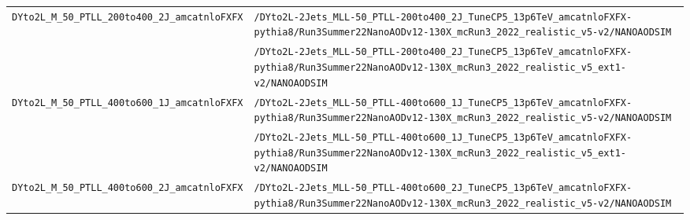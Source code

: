 \begin{longtable}{@{}>{\RaggedRight\arraybackslash}p{} >{\RaggedRight\arraybackslash}p{}@{}}
\addlinespace[2pt]
\texttt{DYto2L\_\allowbreak{}M\_\allowbreak{}50\_\allowbreak{}PTLL\_\allowbreak{}200to400\_\allowbreak{}2J\_\allowbreak{}amcatnloFXFX} & \texttt{/\allowbreak{}DYto2L-\allowbreak{}2Jets\_\allowbreak{}MLL-\allowbreak{}50\_\allowbreak{}PTLL-\allowbreak{}200to400\_\allowbreak{}2J\_\allowbreak{}TuneCP5\_\allowbreak{}13p6TeV\_\allowbreak{}amcatnloFXFX-\allowbreak{}pythia8/\allowbreak{}Run3Summer22NanoAODv12-\allowbreak{}130X\_\allowbreak{}mcRun3\_\allowbreak{}2022\_\allowbreak{}realistic\_\allowbreak{}v5-\allowbreak{}v2/\allowbreak{}NANOAODSIM} \\
 & \texttt{/\allowbreak{}DYto2L-\allowbreak{}2Jets\_\allowbreak{}MLL-\allowbreak{}50\_\allowbreak{}PTLL-\allowbreak{}200to400\_\allowbreak{}2J\_\allowbreak{}TuneCP5\_\allowbreak{}13p6TeV\_\allowbreak{}amcatnloFXFX-\allowbreak{}pythia8/\allowbreak{}Run3Summer22NanoAODv12-\allowbreak{}130X\_\allowbreak{}mcRun3\_\allowbreak{}2022\_\allowbreak{}realistic\_\allowbreak{}v5\_\allowbreak{}ext1-\allowbreak{}v2/\allowbreak{}NANOAODSIM} \\
\addlinespace[2pt]
\texttt{DYto2L\_\allowbreak{}M\_\allowbreak{}50\_\allowbreak{}PTLL\_\allowbreak{}400to600\_\allowbreak{}1J\_\allowbreak{}amcatnloFXFX} & \texttt{/\allowbreak{}DYto2L-\allowbreak{}2Jets\_\allowbreak{}MLL-\allowbreak{}50\_\allowbreak{}PTLL-\allowbreak{}400to600\_\allowbreak{}1J\_\allowbreak{}TuneCP5\_\allowbreak{}13p6TeV\_\allowbreak{}amcatnloFXFX-\allowbreak{}pythia8/\allowbreak{}Run3Summer22NanoAODv12-\allowbreak{}130X\_\allowbreak{}mcRun3\_\allowbreak{}2022\_\allowbreak{}realistic\_\allowbreak{}v5-\allowbreak{}v2/\allowbreak{}NANOAODSIM} \\
 & \texttt{/\allowbreak{}DYto2L-\allowbreak{}2Jets\_\allowbreak{}MLL-\allowbreak{}50\_\allowbreak{}PTLL-\allowbreak{}400to600\_\allowbreak{}1J\_\allowbreak{}TuneCP5\_\allowbreak{}13p6TeV\_\allowbreak{}amcatnloFXFX-\allowbreak{}pythia8/\allowbreak{}Run3Summer22NanoAODv12-\allowbreak{}130X\_\allowbreak{}mcRun3\_\allowbreak{}2022\_\allowbreak{}realistic\_\allowbreak{}v5\_\allowbreak{}ext1-\allowbreak{}v2/\allowbreak{}NANOAODSIM} \\
\addlinespace[2pt]
\texttt{DYto2L\_\allowbreak{}M\_\allowbreak{}50\_\allowbreak{}PTLL\_\allowbreak{}400to600\_\allowbreak{}2J\_\allowbreak{}amcatnloFXFX} & \texttt{/\allowbreak{}DYto2L-\allowbreak{}2Jets\_\allowbreak{}MLL-\allowbreak{}50\_\allowbreak{}PTLL-\allowbreak{}400to600\_\allowbreak{}2J\_\allowbreak{}TuneCP5\_\allowbreak{}13p6TeV\_\allowbreak{}amcatnloFXFX-\allowbreak{}pythia8/\allowbreak{}Run3Summer22NanoAODv12-\allowbreak{}130X\_\allowbreak{}mcRun3\_\allowbreak{}2022\_\allowbreak{}realistic\_\allowbreak{}v5-\allowbreak{}v2/\allowbreak{}NANOAODSIM} \\

\end{longtable}
